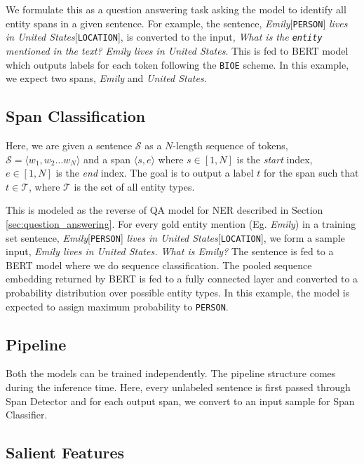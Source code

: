 We formulate this as a question answering task asking the model to identify all entity spans in a given sentence. For example, the sentence, \textit{Emily}[\texttt{PERSON}] \textit{lives in United States}[\texttt{LOCATION}], is converted to the input, \textit{What is the \texttt{entity} mentioned in the text? Emily lives in United States}. This is fed to BERT model which outputs labels for each token following the \texttt{BIOE} scheme. In this example, we expect two spans, \textit{Emily} and \textit{United States}. 

\subsection{Span Classification}
Here, we are given a sentence $\mathcal{S}$ as a $N$-length sequence of tokens, $\mathcal{S} = \langle w_1, w_2 \ldots w_N \rangle$ and a span $\langle s, e\rangle$ where $s \in [1, N]$ is the \textit{start} index, $e \in [1, N]$ is the \textit{end} index. The goal is to output a label $t$ for the span such that $t \in \mathcal{T}$, where $\mathcal{T}$ is the set of all entity types.

This is modeled as the reverse of QA model for NER described in Section \ref{sec:question_answering}. For every gold entity mention (Eg. \textit{Emily}) in a training set sentence, \textit{Emily}[\texttt{PERSON}] \textit{lives in United States}[\texttt{LOCATION}], we form a sample input, \textit{Emily lives in United States. What is Emily?} The sentence is fed to a BERT model where we do sequence classification. The pooled sequence embedding returned by BERT is fed to a fully connected layer and converted to a probability distribution over possible entity types. In this example, the model is expected to assign maximum probability to \texttt{PERSON}.

\subsection{Pipeline}
Both the models can be trained independently. The pipeline structure comes during the inference time. Here, every unlabeled sentence is first passed through Span Detector and for each output span, we convert to an input sample for Span Classifier.

\subsection{Salient Features}

